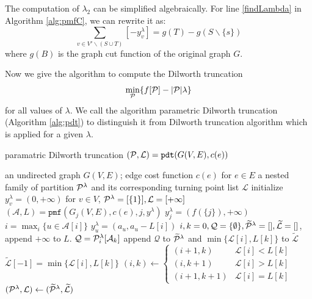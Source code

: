 \documentclass{article}
\begin{document}
The computation of $\lambda_2$ can be simplified algebraically. For line \ref{findLambda} in  Algorithm \ref{alg:pmfC},  we can rewrite it as:
\begin{equation*}
\sum_{v\in V'\backslash (S\cup T)} [-y^{\lambda}_v ] = g(T)-g(S\backslash\{s\})
\end{equation*}
where $g(B)$ is the graph cut function of the original graph $G$.

Now we give the algorithm to compute the Dilworth truncation $$\min_{\P}\{f[\P] - \abs{\P} \lambda \}$$for all values of $\lambda$. We call the algorithm parametric Dilworth truncation (Algorithm \ref{alg:pdt}) to distinguish it from Dilworth truncation algorithm which is applied for a given $\lambda$.
\begin{algorithm}
\caption{paramatric Dilworth truncation $(\P, \mathcal{L})=\texttt{pdt}(G(V,E), c(e))$}\label{alg:pdt}
\begin{algorithmic}[1]
\REQUIRE an undirected graph $G(V, E)$; edge cost function $c(e)$ for $e\in E$
\ENSURE a nested family of partition $\P^{\lambda}$ and its corresponding turning point list $\mathcal{L}$
\STATE initialize $y^{\lambda}_v = (0, +\infty)$ for $ v \in V$, $\P^{\lambda} = [\{1\}], \mathcal{L} = [+\infty]$
\STATE  $(\mathcal{A}, L) = \texttt{pmf}(G_j(V,E), c(e), j, y^{\lambda})$\footnotemark
{}
\STATE $y^{\lambda}_j = (f(\{j\}), +\infty)$
\ELSE
\STATE $ i = \max_i \{ u \in \mathcal{A}[i]\}$
\STATE $y_u^{\lambda} = (a_u, a_u - L[i])$
\ENDIF
\ENDIF
\ENDFOR
\STATE $i, k = 0, \mathcal{Q} = \{\emptyset\}, \widetilde{\mathcal{\P}}^{\lambda} = [], \widetilde{\mathcal{L}} = []$, append $+\infty$ to $L$.
\STATE $\mathcal{Q} = \P^{\lambda}_i[\mathcal{A}_k]$
\STATE append $\mathcal{Q}$ to $\widetilde{\mathcal{\P}}^{\lambda}$ and $\min\{\mathcal{L}[i], L[k]\}$
to $\widetilde{\mathcal{L}}$
\ELSE
\STATE $\widetilde{\mathcal{L}}[-1] = \min\{\mathcal{L}[i], L[k]\}$
\ENDIF
\STATE $(i, k) \leftarrow \begin{cases} (i+1, k) & \mathcal{L}[i] < L[k] \\  (i, k+1) & \mathcal{L}[i] > L[k]\\ (i+1, k+1) & \mathcal{L}[i] = L[k]\end{cases}$
\ENDWHILE
\STATE $(\P^{\lambda}, \mathcal{L}) \leftarrow (\widetilde{\mathcal{\P}}^{\lambda},  \widetilde{\mathcal{L}})$
\ENDFOR
\end{algorithmic}
\end{algorithm}
\end{document}
